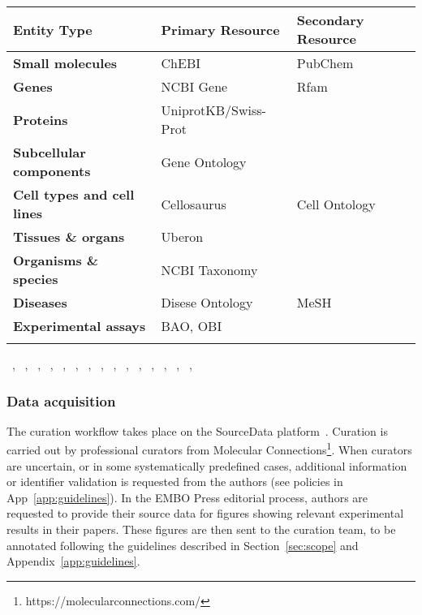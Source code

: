 \documentclass{bioinfo}
\begin{document}
\begin{methods}
\begin{table}[!t]
{    \begin{tabular}{@{}l|ll@{}}\toprule 
    \textbf{Entity Type}               & \textbf{Primary Resource}           & \textbf{Secondary Resource}      \\\midrule
    \textbf{Small molecules}           & ChEBI                           & PubChem                   \\
    \textbf{Genes}                     & NCBI Gene                       & Rfam                      \\
    \textbf{Proteins}                  & UniprotKB/Swiss-Prot            &                                  \\
    \textbf{Subcellular components}       & Gene Ontology               &                                  \\
    \textbf{Cell types and cell lines} & Cellosaurus                     & Cell Ontology             \\
    \textbf{Tissues \& organs}         & Uberon                          &                                  \\
    \textbf{Organisms \& species}      & NCBI Taxonomy               &                                  \\
    \textbf{Diseases}                  & Disese Ontology              & MeSH                      \\
    \textbf{Experimental assays}       & BAO, OBI              &                                  \\\botrule
    \end{tabular}}{
    ~\citealp{chebi}, ~\citealp{ncbigene}, ~\citealp{uniprot}, 
    ~\citealp{geneont1}, ~\citealp{genont2}, ~\citealp{cellosaurus}, 
    ~\citealp{uberon}, ~\citealp{ncbitaxonomy1}, ~\citealp{ncbitaxonomy2}, 
    ~\citealp{bao}, ~\citealp{obi}, ~\citealp{pubchem}, ~\citealp{rfam}, ~\citealp{cellont}, ~\citealp{do}, ~\citealp{mesh}
    }
\end{table}

\subsubsection{Data acquisition}

The curation workflow takes place on the SourceData platform~\citep{sourcedata}. Curation is carried out by professional curators from Molecular Connections\footnote{https://molecularconnections.com/}. When curators are uncertain, or in some systematically predefined cases, additional information or identifier validation is requested from the authors (see policies in App~\ref{app:guidelines}). In the EMBO Press editorial process, authors are requested to provide their source data for figures showing relevant experimental results in their papers. These figures are then sent to the curation team, to be annotated following the guidelines described in Section~\ref{sec:scope} and Appendix~\ref{app:guidelines}. 


\end{methods}
\end{document}
